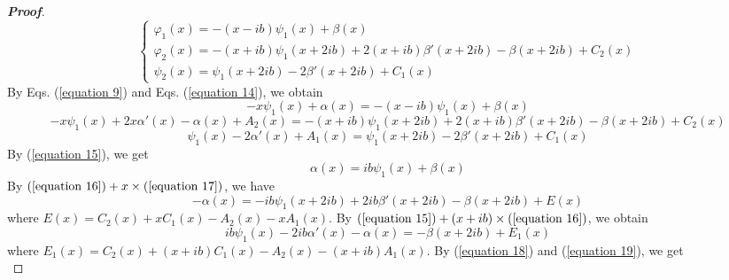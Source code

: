 \documentclass[a4paper]{article}      %
\begin{document}
\begin{proof}[{\bf Proof}]
\begin{equation}
        \left\{ {\begin{array}{*{20}{l}}
        {\varphi_{1}(x)=-(x-ib)\psi_{1}(x)+\beta(x)}\\
        {\varphi_{2}(x)=-(x+ib)\psi_{1}(x+2ib)+2(x+ib)\beta'(x+2ib)-\beta(x+2ib)+C_{2}(x)}\\
        {\psi_{2}(x)=\psi_{1}(x+2ib)-2\beta'(x+2ib)+C_{1}(x)}
        \end{array}} \right.
       \end{equation}
    By Eqs. (\ref{equation 9}) and Eqs. (\ref{equation 14}), we obtain
        \begin{equation}\label{equation 15}                                 %
         -x\psi_{1}(x)+\alpha(x)=-(x-ib)\psi_{1}(x)+\beta(x)
        \end{equation}
        \begin{equation}\label{equation 16}                                 %
        -x\psi_{1}(x)+2x\alpha'(x)-\alpha(x)+A_{2}(x)=-(x+ib)\psi_{1}(x+2ib)+2(x+ib)\beta'(x+2ib)-\beta(x+2ib)+C_{2}(x)
        \end{equation}
        \begin{equation}\label{equation 17}                                 %
        \psi_{1}(x)-2\alpha'(x)+A_{1}(x)=\psi_{1}(x+2ib)-2\beta'(x+2ib)+C_{1}(x)
        \end{equation}
    By (\ref{equation 15}), we get
        \begin{equation}\label{equation 18}                                 %
        \alpha(x)=ib\psi_{1}(x)+\beta(x)
        \end{equation}
    By $(\ref{equation 16})+x\times(\ref{equation 17})$, we have
        \begin{equation}\label{equation 19}                                 %
        -\alpha(x)=-ib\psi_{1}(x+2ib)+2ib\beta'(x+2ib)-\beta(x+2ib)+E(x)
        \end{equation}
    where $E(x)=C_{2}(x)+xC_{1}(x)-A_{2}(x)-xA_{1}(x)$. By $(\ref{equation 15})+(x+ib)\times(\ref{equation 16})$, we obtain
        \begin{equation}\label{equation 20}                                 %
        ib\psi_{1}(x)-2ib\alpha'(x)-\alpha(x)=-\beta(x+2ib)+E_{1}(x)
        \end{equation}
    where $E_{1}(x)=C_{2}(x)+(x+ib)C_{1}(x)-A_{2}(x)-(x+ib)A_{1}(x)$.
    By (\ref{equation 18}) and (\ref{equation 19}), we get
    \begin{equation}\label{equation 21}                                     %

\end{equation}
\end{proof}
\end{document}
